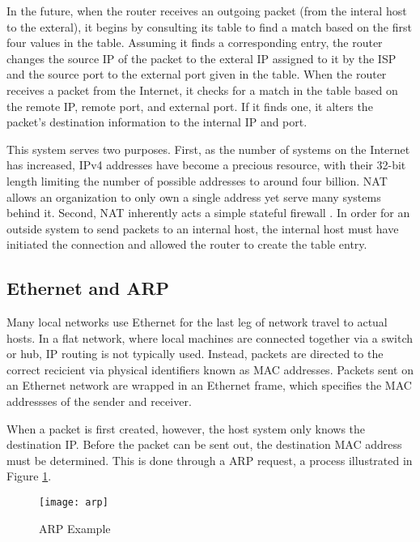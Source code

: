 \par In the future, when the router receives an outgoing packet (from the interal host to the exteral), it begins by consulting its table to find a match based on the first four values in the table. Assuming it finds a corresponding entry, the router changes the source IP of the packet to the exteral IP assigned to it by the \ac{ISP} and the source port to the external port given in the table. When the router receives a packet from the Internet, it checks for a match in the table based on the remote IP, remote port, and external port. If it finds one, it alters the packet's destination information to the internal IP and port.

\par This system serves two purposes. First, as the number of systems on the Internet has increased, \ac{IPv4} addresses have become a precious resource, with their 32-bit length limiting the number of possible addresses to around four billion. \ac{NAT} allows an organization to only own a single address yet serve many systems behind it. Second, \ac{NAT} inherently acts a simple stateful firewall \cite{DynAddrMalProp}. In order for an outside system to send packets to an internal host, the internal host must have initiated the connection and allowed the router to create the table entry.

\subsection{Ethernet and \acf{ARP}}
\label{sec:eth_routing}
\par Many local networks use Ethernet for the last leg of network travel to actual hosts. In a flat network, where local machines are connected together via a switch or hub, \ac{IP} routing is not typically used. Instead, packets are directed to the correct recicient via physical identifiers known as \ac{MAC} addresses. Packets sent on an Ethernet network are wrapped in an Ethernet frame, which specifies the \ac{MAC} addressses of the sender and receiver.

\par When a packet is first created, however, the host system only knows the destination \ac{IP}. Before the packet can be sent out, the destination \ac{MAC} address must be determined. This is done through a \ac{ARP} request, a process illustrated in Figure \ref{fig:arp_example}.

\begin{figure}[ht]
\caption{\ac{ARP} Example}
\label{fig:arp_example}
\centering
\texttt{[image: arp]}
\end{figure}

